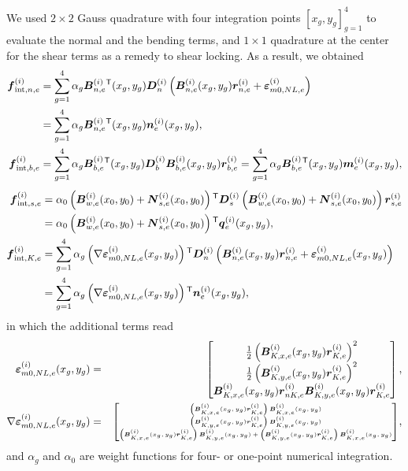 \documentclass[11pt]{article}
\newcommand{\strain}{\varepsilon}
\newcommand{\mONLe}{_{m0,NL,e}}
\newcommand{\Dn}{\mtrx{D}_n}
\newcommand{\Db}{\mtrx{D}_b}
\newcommand{\Ds}{\mtrx{D}_s}
\newcommand{\layer}[1]{^{(#1)}}
\newcommand{\el}{_e}
\newcommand{\elen}{_{n,e}}
\newcommand{\eleb}{_{b,e}}
\newcommand{\eles}{_{s,e}}
\newcommand{\eleNL}{_{K,e}}
\newcommand{\eleNLx}{_{K,x,e}}
\newcommand{\eleNLy}{_{K,y,e}}
\newcommand{\elenNL}{_{nK,e}}
\newcommand{\ielen}{_{\mathrm{int},n,e}}
\newcommand{\ieleb}{_{\mathrm{int},b,e}}
\newcommand{\ieles}{_{\mathrm{int},s,e}}
\newcommand{\ieleNL}{_{\mathrm{int},K,e}}
\newcommand{\M}[1]{{\boldsymbol #1}}
\newcommand{\wf}{\alpha}
\newcommand{\elew}{_{w,e}}
\begin{document}
We used $2\times 2$ Gauss quadrature with four integration points $[x_g, y_g]^4_{g=1}$ to evaluate the normal and the
bending terms, and $1\times 1$ quadrature at the center for the shear terms as a remedy to shear locking. As a result, we obtained
\begin{align*}
\M{f}\layer{i}\ielen 
&=
\sum_{g=1}^4 \wf_g
\M{B}\layer{i}\elen\trn(x_g,y_g) 
\Dn\layer{i} 
\left(
  \M{B}\layer{i}\elen(x_g,y_g)\mtrx{r}\layer{i}\elen
  + 
  \mtrx{\strain}\mONLe\layer{i}\right)
\\
& = 
\sum_{g=1}^4 \wf_g
\M{B}\layer{i}\elen\trn(x_g,y_g) 
\M{n}\layer{i}\el(x_g, y_g),
\\
\M{f}\layer{i}\ieleb 
& = 
\sum_{g=1}^4 \wf_g
\M{B}\layer{i}\eleb\trn(x_g,y_g) 
\Db\layer{i} 
\M{B}\layer{i}\eleb(x_g,y_g)\mtrx{r}\layer{i}\eleb
=
\sum_{g=1}^4 \wf_g
\M{B}\layer{i}\eleb\trn(x_g,y_g) 
\M{m}\layer{i}\el(x_g, y_g),
\end{align*}
\begin{align*}
\M{f}\layer{i}\ieles 
& = 
\wf_0 
\left( 
  \M{B}\layer{i}\elew(x_0,y_0) + \M{N}\layer{i}\eles(x_0,y_0) 
\right)\trn
\Ds\layer{i} 
\left( 
  \M{B}\layer{i}\elew(x_0,y_0) + \M{N}\layer{i}\eles(x_0,y_0)
\right)
\mtrx{r}\layer{i}\eles
\\ 
& =
\wf_0
\left( 
  \M{B}\layer{i}\elew(x_0,y_0) + \M{N}\layer{i}\eles(x_0,y_0) 
\right)\trn
\M{q}\layer{i}\el(x_g, y_g),
\\
\M{f}\layer{i}\ieleNL 
& = 
\sum_{g=1}^4 \wf_g
\left(  \nabla \mtrx{\strain}\mONLe\layer{i}(x_g,y_g)
\right)\trn \Dn\layer{i}
\left( \M{B}\layer{i}\elen(x_g,y_g)\mtrx{r}\layer{i}\elen +
\mtrx{\strain}\mONLe\layer{i}(x_g,y_g) \right)
\\
& = 
\sum_{g=1}^4 \wf_g
\left( \nabla \mtrx{\strain}\mONLe\layer{i}(x_g,y_g)
\right)\trn
\M{n}\layer{i}\el(x_g, y_g),
\end{align*}
in which the additional terms read 
\begin{eqnarray*}
\mtrx{\strain}\mONLe\layer{i} (x_g,y_g) &=& 
\begin{bmatrix}
\frac{1}{2}\left( \M{B}\layer{i}\eleNLx(x_g,y_g) \mtrx{r}\layer{i}\eleNL \right)^2\\
\frac{1}{2}\left( \M{B}\layer{i}\eleNLy(x_g,y_g) \mtrx{r}\layer{i}\eleNL \right)^2\\
\M{B}\layer{i}\eleNLx(x_g,y_g) \mtrx{r}\layer{i}\elenNL \M{B}\layer{i}\eleNLy(x_g,y_g) \mtrx{r}\layer{i}\eleNL
\end{bmatrix},\\
\nabla\mtrx{\strain}\mONLe\layer{i}(x_g,y_g) &=& 
\tiny{
\begin{bmatrix}
\left( \M{B}\layer{i}\eleNLx(x_g,y_g) \mtrx{r}\layer{i}\eleNL \right) \M{B}\layer{i}\eleNLx(x_g,y_g)\\
\left( \M{B}\layer{i}\eleNLy(x_g,y_g) \mtrx{r}\layer{i}\eleNL \right) \M{B}\layer{i}\eleNLy(x_g,y_g)\\
\left( \M{B}\layer{i}\eleNLx(x_g,y_g) \mtrx{r}\layer{i}\eleNL \right) \M{B}\layer{i}\eleNLy(x_g,y_g) +
\left( \M{B}\layer{i}\eleNLy(x_g,y_g) \mtrx{r}\layer{i}\eleNL \right) \M{B}\layer{i}\eleNLx(x_g,y_g)
\end{bmatrix}},
\end{eqnarray*}
and $\wf_g$ and $\wf_0$ are weight functions for four- or one-point numerical integration.
\end{document}
